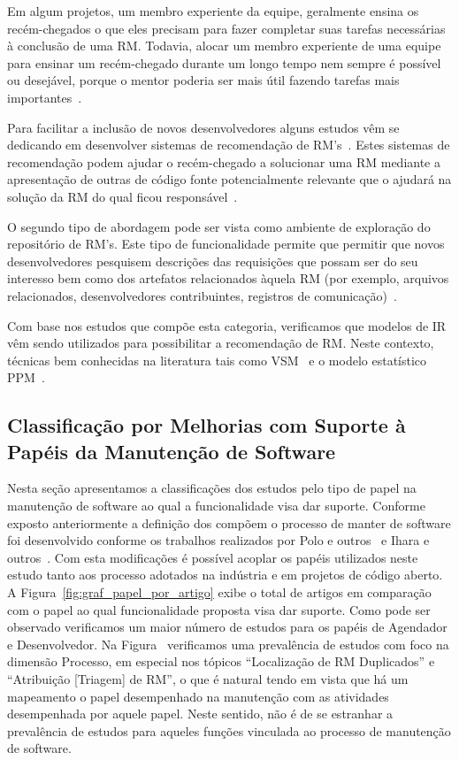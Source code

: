 Em algum projetos, um membro experiente da equipe, geralmente ensina os
recém-chegados o que eles precisam para fazer completar suas tarefas necessárias
à conclusão de uma RM\@. Todavia, alocar um membro experiente de uma equipe para
ensinar um recém-chegado durante um longo tempo nem sempre é possível ou
desejável, porque o mentor poderia ser mais útil fazendo tarefas mais
importantes~\cite{malheiros2012source}.

Para facilitar a inclusão de novos desenvolvedores alguns estudos vêm se
dedicando em desenvolver sistemas de recomendação de
RM's~\cite{malheiros2012source, Wang2011bug}. Estes sistemas de recomendação
podem ajudar o recém-chegado a solucionar uma RM mediante a apresentação de
outras de código fonte potencialmente relevante que o ajudará na solução da RM
do qual ficou responsável~\cite{malheiros2012source}.

O segundo tipo de abordagem pode ser vista como ambiente de exploração do
repositório de RM's.  Este tipo de funcionalidade permite que permitir que novos
desenvolvedores pesquisem descrições das requisições que possam ser do seu
interesso bem como dos artefatos relacionados àquela RM (por exemplo, arquivos
relacionados, desenvolvedores contribuintes, registros de
comunicação)~\cite{Wang2011bug}.

Com base nos estudos que compõe esta categoria, verificamos que modelos de IR
vêm sendo utilizados para possibilitar a recomendação de RM\@. Neste contexto,
técnicas bem conhecidas na literatura tais como VSM~\cite{Wang2011bug} e o
modelo estatístico PPM~\cite{malheiros2012source}.

\subsection{Classificação por Melhorias com Suporte à Papéis da Manutenção de
	Software}
\label{sub:extensões_com_suporte_a_papeis}
Nesta seção apresentamos a classificações dos estudos pelo tipo de papel na
manutenção de software ao qual a funcionalidade visa dar suporte. Conforme
exposto anteriormente a definição dos compõem o processo de manter de software
foi desenvolvido conforme os trabalhos realizados por Polo e
outros~\cite{Polo1999} e Ihara e outros~\cite{Ihara:2009:AMI:1595808.1595833}\@.
Com esta modificações é possível acoplar os papéis utilizados neste estudo tanto
aos processo adotados na indústria e em projetos de código aberto. A
Figura~\ref{fig:graf_papel_por_artigo} exibe o total de artigos em comparação
com o papel ao qual funcionalidade proposta visa dar suporte. Como pode ser
observado verificamos um maior número de estudos para os papéis de Agendador e
Desenvolvedor. Na Figura~\cite{fig:grafico_topico_por_artigo} verificamos uma
prevalência de estudos com foco na dimensão Processo, em especial nos tópicos
``Localização de RM Duplicados'' e ``Atribuição [Triagem] de RM'', o que  é natural
tendo em vista que há um mapeamento o papel desempenhado na manutenção com as
atividades desempenhada por aquele papel. Neste sentido, não é de se estranhar a
prevalência de estudos para aqueles funções vinculada ao processo de manutenção
de software.

